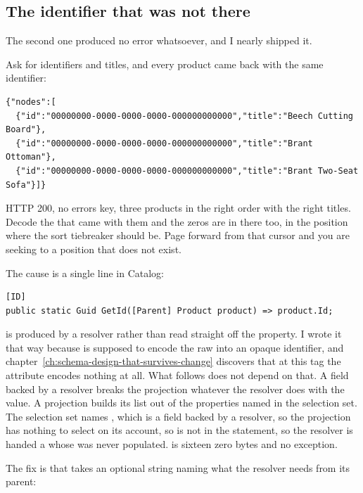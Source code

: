 \subsection*{The identifier that was not there}

%
The second one produced no error whatsoever, and I nearly shipped it.

Ask  for identifiers and titles, and every product came
back with the same identifier:

\begin{verbatim}
{"nodes":[
  {"id":"00000000-0000-0000-0000-000000000000","title":"Beech Cutting Board"},
  {"id":"00000000-0000-0000-0000-000000000000","title":"Brant Ottoman"},
  {"id":"00000000-0000-0000-0000-000000000000","title":"Brant Two-Seat Sofa"}]}
\end{verbatim}

HTTP 200, no errors key, three products in the right order with the right
titles. Decode the  that came with them and the zeros are in
there too, in the position where the sort tiebreaker should be. Page forward
from that cursor and you are seeking to a position that does not exist.

%
The cause is a single line in Catalog:

\begin{verbatim}
[ID]
public static Guid GetId([Parent] Product product) => product.Id;
\end{verbatim}

 is produced by a resolver rather than read straight off the
property. I wrote it that way because \code{[ID]} is supposed to encode the raw
 into an opaque identifier, and
chapter~\ref{ch:schema-design-that-survives-change} discovers that at this tag
the attribute encodes nothing at all. What follows does not depend on that.
A field backed by a resolver breaks the projection whatever the resolver
does with the value. A projection builds its  list out of the properties
named in the selection set. The selection set names , which is a field
backed by a resolver, so the projection has nothing to select on its account,
so  is not in the statement, so the resolver is handed a
 whose  was never populated.  is
sixteen zero bytes and no exception.

The fix is that  takes an optional string naming what the
resolver needs from its parent:

